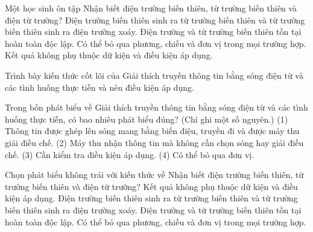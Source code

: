 \begin{ex}
Một học sinh ôn tập Nhận biết điện trường biến thiên, từ trường biến thiên và điện từ trường?
\choice
{\True Điện trường biến thiên sinh ra từ trường biến thiên và từ trường biến thiên sinh ra điện trường xoáy.}
{Điện trường và từ trường biến thiên tồn tại hoàn toàn độc lập.}
{Có thể bỏ qua phương, chiều và đơn vị trong mọi trường hợp.}
{Kết quả không phụ thuộc dữ kiện và điều kiện áp dụng.}
\end{ex}

\begin{bt}
Trình bày kiến thức cốt lõi của Giải thích truyền thông tin bằng sóng điện từ và các tình huống thực tiễn và nêu điều kiện áp dụng.
\end{bt}

\begin{ex}
Trong bốn phát biểu về Giải thích truyền thông tin bằng sóng điện từ và các tình huống thực tiễn, có bao nhiêu phát biểu đúng? (Chỉ ghi một số nguyên.) (1) Thông tin được ghép lên sóng mang bằng biến điệu, truyền đi và được máy thu giải điều chế. (2) Máy thu nhận thông tin mà không cần chọn sóng hay giải điều chế. (3) Cần kiểm tra điều kiện áp dụng. (4) Có thể bỏ qua đơn vị.
\end{ex}

\begin{ex}
Chọn phát biểu không trái với kiến thức về Nhận biết điện trường biến thiên, từ trường biến thiên và điện từ trường?
\choice
{Kết quả không phụ thuộc dữ kiện và điều kiện áp dụng.}
{\True Điện trường biến thiên sinh ra từ trường biến thiên và từ trường biến thiên sinh ra điện trường xoáy.}
{Điện trường và từ trường biến thiên tồn tại hoàn toàn độc lập.}
{Có thể bỏ qua phương, chiều và đơn vị trong mọi trường hợp.}
\end{ex}

